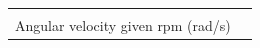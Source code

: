 \documentclass[
  letterpaper,
  DIV=11,
  numbers=noendperiod]{scrreprt}
\theoremstyle{definition}
\theoremstyle{remark}
\begin{document}
\begin{longtable}[]{@{}
  >{\raggedright\arraybackslash}p{}
  >{\raggedright\arraybackslash}p{}@{}}
                                                                                                                                                                                                                                                                                                                                                                                                                                                                                                                                                                                                                                                                                                                                                                                                                                                                                                                                                                                                                                                                                                                                                                                                                                                                                                                                                                                                                                                                                                                                                                                                                                                                                                                                        \) \\
Angular velocity given rpm (rad/s) &

\end{longtable}
\end{document}
